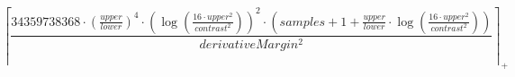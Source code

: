 \[\left\lceil \frac{34359738368 \cdot \left(\frac{upper}{lower}\right)^{4} \cdot \left(\log\left(\frac{16 \cdot upper^{2}}{contrast^{2}}\right)\right)^{2} \cdot \left(samples + 1 + \frac{upper}{lower} \cdot \log\left(\frac{16 \cdot upper^{2}}{contrast^{2}}\right)\right)}{derivativeMargin^{2}} \right\rceil_{+}\]
